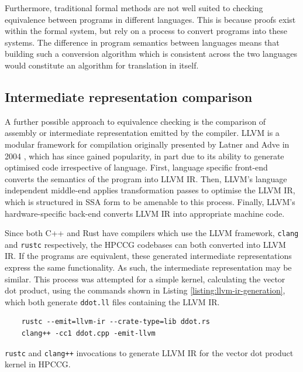 Furthermore, traditional formal methods are not well suited to checking equivalence between programs in different languages. This is because proofs exist within the formal system, but rely on a process to convert programs into these systems. The difference in program semantics between languages means that building such a conversion algorithm which is consistent across the two languages would constitute an algorithm for translation in itself.

\subsection{Intermediate representation comparison}
\label{ssec:equivalence-ir-comparison}

A further possible approach to equivalence checking is the comparison of assembly or intermediate representation emitted by the compiler. LLVM is a modular framework for compilation originally presented by Latner and Adve in 2004 \cite{lattner2004llvm}, which has since gained popularity, in part due to its ability to generate optimised code irrespective of language. First, language specific front-end converts the semantics of the program into \acrfull{LLVM IR}. Then, LLVM's language independent middle-end applies transformation passes to optimise the \acrshort{LLVM IR}, which is structured in \acrfull{SSA} form to be amenable to this process. Finally, LLVM's hardware-specific back-end converts \acrshort{LLVM IR} into appropriate machine code.


Since both C++ and Rust have compilers which use the LLVM framework, \texttt{clang} and \texttt{rustc} respectively, the \acrshort{HPCCG} codebases can both converted into \acrshort{LLVM IR}. If the programs are equivalent, these generated intermediate representations express the same functionality. As such, the intermediate representation may be similar. This process was attempted for a simple kernel, calculating the vector dot product, using the commands shown in Listing \ref{listing:llvm-ir-generation}, which both generate \texttt{ddot.ll} files containing the \acrshort{LLVM IR}.

\begin{listing}[H]
    \begin{verbatim}
    rustc --emit=llvm-ir --crate-type=lib ddot.rs
    clang++ -cc1 ddot.cpp -emit-llvm
    \end{verbatim}
    \caption{\texttt{rustc} and \texttt{clang++} invocations to generate \acrshort{LLVM IR} for the vector dot product kernel in \acrshort{HPCCG}.}
    \label{listing:llvm-ir-generation}
\end{listing}


